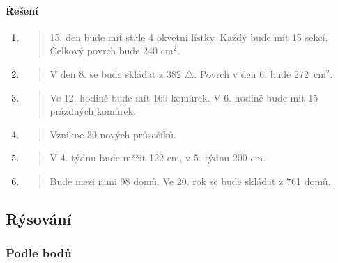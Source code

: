 \newpage

\paragraph{Řešení}
\begin{enumerate}
    \item
    \begin{quote}
        15. den bude mít stále 4 okvětní lístky. Každý bude mít 15 sekcí. Celkový povrch bude 240 cm$^{2}$.
    \end{quote}

    \item
    \begin{quote}
        V den 8. se bude skládat z 382 $\triangle$. Povrch v den 6. bude 272~cm$^{2}$.
    \end{quote}

    \item
    \begin{quote}
        Ve 12. hodině bude mít 169 komůrek. V 6. hodině bude mít 15 prázdných komůrek.
    \end{quote}

    \item
    \begin{quote}
        Vznikne 30 nových průsečíků.
    \end{quote}

    \item
    \begin{quote}
        V 4. týdnu bude měřit 122 cm, v 5. týdnu 200 cm.
    \end{quote}

    \item
    \begin{quote}
        Bude mezi nimi 98 domů. Ve 20. rok se bude skládat z 761 domů.
    \end{quote}
\end{enumerate}

\newpage

\subsection{Rýsování}
\label{subsec:rysovani}

\subsubsection{Podle bodů}

